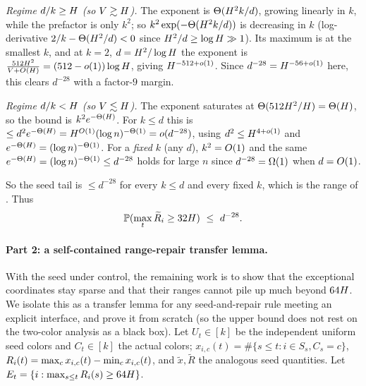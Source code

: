 \emph{Regime $d/k\ge H$ (so $V\gtrsim H$).} The exponent is $\Theta(H^2 k/d)$, growing linearly in $k$, while the
prefactor is only $k^2$; so $k^2\exp(-\Theta(H^2 k/d))$ is decreasing in $k$ (log-derivative $2/k-\Theta(H^2/d)<0$ since
$H^2/d\ge\log H\gg1$). Its maximum is at the smallest $k$, and at $k=2$, $d=H^2/\log H$ the exponent is
$\frac{512H^2}{V+O(H)}=(512-o(1))\log H$, giving $H^{-512+o(1)}$. Since $d^{-28}=H^{-56+o(1)}$
here, this clears $d^{-28}$ with a factor-$9$ margin.

\emph{Regime $d/k<H$ (so $V\lesssim H$).} The exponent saturates at $\Theta(512H^2/H)=\Theta(H)$, so
the bound is $k^2 e^{-\Theta(H)}$. For $k\le d$ this is $\le d^2 e^{-\Theta(H)}=H^{O(1)}(\log n)^{-\Theta(1)}=o(d^{-28})$,
using $d^2\le H^{4+o(1)}$ and $e^{-\Theta(H)}=(\log n)^{-\Theta(1)}$. For a \emph{fixed} $k$ (any $d$), $k^2=O(1)$ and
the same $e^{-\Theta(H)}=(\log n)^{-\Theta(1)}\le d^{-28}$ holds for large $n$ since $d^{-28}=\Omega(1)$ when $d=O(1)$.

So the seed tail is $\le d^{-28}$ for every $k\le d$ and every fixed $k$, which is the range of . Thus
\begin{equation}\label{eq:seed-tail}
  \mathbb{P}(\max_t\widetilde R_i\ge 32H)\ \le\ d^{-28}.
\end{equation}

\paragraph{Part 2: a self-contained range-repair transfer lemma.}
With the seed under control, the remaining work is to show that the exceptional coordinates stay sparse and that their ranges
cannot pile up much beyond $64H$. We isolate this as a transfer lemma for any seed-and-repair rule meeting an explicit
interface, and prove it from scratch (so the upper bound does not rest on the two-color analysis as a black box). Let
$U_t\in[k]$ be the independent uniform seed colors and $C_t\in[k]$ the actual colors; $x_{i,c}(t)=\#\{s\le t:i\in S_s,C_s=c\}$,
$R_i(t)=\max_c x_{i,c}(t)-\min_c x_{i,c}(t)$, and $\widetilde x,\widetilde R$ the analogous seed quantities. Let
$E_t=\{i:\max_{s\le t}R_i(s)\ge 64H\}$.

